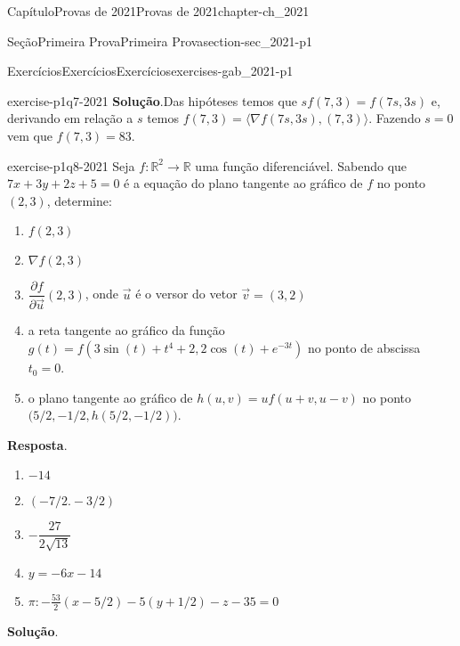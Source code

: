 \documentclass[oneside,10pt,]{book}
\newcommand{\blocktitlefont}{\relax}
\numberwithin{equation}{section}
\newcommand{\R}{\mathbb R}
\begin{document}
\begin{chapterptx}{Capítulo}{Provas de 2021}{}{Provas de 2021}{}{}{chapter-ch_2021}
\begin{sectionptx}{Seção}{Primeira Prova}{}{Primeira Prova}{}{}{section-sec_2021-p1}
\begin{exercises-subsection-numberless}{Exercícios}{Exercícios}{}{Exercícios}{}{}{exercises-gab_2021-p1}
\begin{divisionexercise}{7}{}{}{exercise-p1q7-2021}
\noindent\textbf{\blocktitlefont Solução}.\hypertarget{solution-p1q7-2021-d}{}\quad{}Das hipóteses temos que \(sf(7,3)=f(7s,3s)\) e, derivando em relação a \(s\) temos \(f(7,3)=\big\langle\nabla
f(7s,3s),(7,3)\big\rangle\). Fazendo \(s=0\) vem que \(f(7,3)=83\).%
\end{divisionexercise}%
\begin{divisionexercise}{8}{}{}{exercise-p1q8-2021}%
Seja \(f\colon\R^2\to\R\) uma função diferenciável. Sabendo que \(7x+3y+2z+5=0\) é a equação do plano tangente ao gráfico de \(f\) no ponto \((2,3)\), determine:%
\begin{enumerate}[label=\alph*]
\item{}\(\displaystyle f(2,3)\)%
\item{}\(\displaystyle \nabla f(2,3)\)%
\item{}\(\dfrac{\partial f}{\partial\vec{u}}(2,3)\), onde \(\vec{u}\) é o versor do vetor \(\vec{v}=(3,2)\)%
\item{}a reta tangente ao gráfico da função \(g(t)=f(3\sin(t)+t^4+2,2\cos(t)+e^{-3t})\) no ponto de abscissa \(t_0=0\).%
\item{}o plano tangente ao gráfico de \(h(u,v)=uf(u+v,u-v)\) no ponto \(\big(5/2,-1/2,h(5/2,-1/2)\big)\).%
\end{enumerate}
%
\par\smallskip%
\noindent\textbf{\blocktitlefont Resposta}.\hypertarget{answer-p1q8-2021-b}{}\quad{}%
\begin{enumerate}[label=\alph*]
\item{}\(\displaystyle -14\)%
\item{}\(\displaystyle (-7/2.-3/2)\)%
\item{}\(\displaystyle -\dfrac{27}{2\sqrt{13}}\)%
\item{}\(\displaystyle y=-6x-14\)%
\item{}\(\displaystyle \pi\colon -\frac{53}{2}(x-5/2)-5(y+1/2)-z-35=0\)%
\end{enumerate}
\par\smallskip%
\noindent\textbf{\blocktitlefont Solução}.\hypertarget{solution-p1q8-2021-c}{}\quad{}%
\end{divisionexercise}
\end{exercises-subsection-numberless}
\end{sectionptx}
\end{chapterptx}
\end{document}
